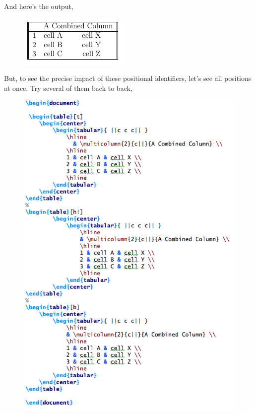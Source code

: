 \documentclass[11pt]{article}
\begin{document}
And here's the output, 

\begin{figure}[!h]
	\includegraphics[scale=.6]{OUT5} \\ %
	\centering
\end{figure}

But, to see the precise impact of these positional identifiers, let's see all positions at once. Try several of them back to back,

\begin{figure}[!h]
	\includegraphics[scale=.5]{CODE6} \\ %
\end{figure}
\end{document}
